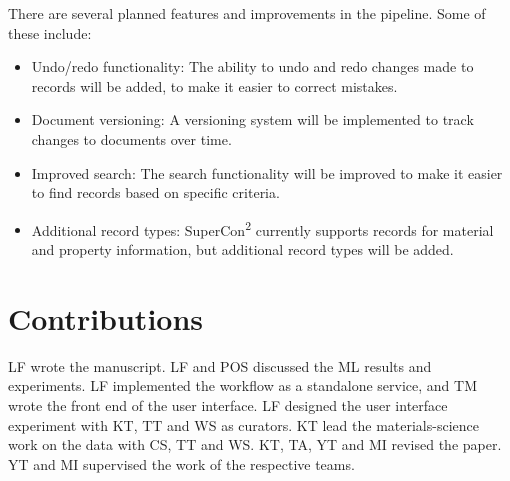 \documentclass[a4paper]{article}
\begin{document}
There are several planned features and improvements in the pipeline. Some of these include:

\begin{itemize}
    \item Undo/redo functionality: The ability to undo and redo changes made to records will be added, to make it easier to correct mistakes.
    \item Document versioning: A versioning system will be implemented to track changes to documents over time.
    \item Improved search: The search functionality will be improved to make it easier to find records based on specific criteria.
    \item Additional record types: SuperCon\textsuperscript{2} currently supports records for material and property information, but additional record types will be added.
\end{itemize}

\section*{Contributions}
LF wrote the manuscript. 
LF and POS discussed the ML results and experiments. 
LF implemented the workflow as a standalone service, and TM wrote the front end of the user interface. 
LF designed the user interface experiment with KT, TT and WS as curators.
KT lead the materials-science work on the data with CS, TT and WS.
KT, TA, YT and MI revised the paper.
YT and MI supervised the work of the respective teams. 




\end{document}
